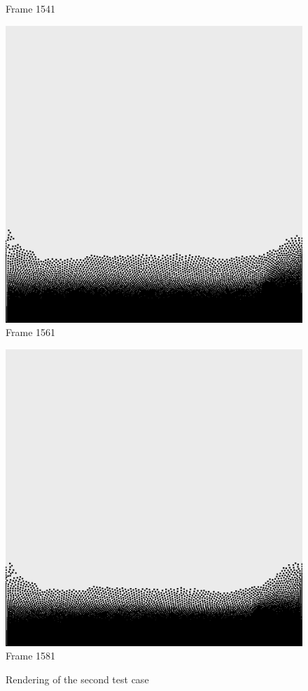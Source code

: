 \documentclass[a4paper, 12pt, oneside]{book}
\begin{document}
\begin{figure}[!ht]
\begin{center}
            Frame 1541
        \end{center}
    \endminipage
    \hfill
        \begin{center}
            \includegraphics[width=\linewidth]{images/test_case_2/1561.png}
            Frame 1561
        \end{center}
    \endminipage
    \hfill
        \begin{center}
            \includegraphics[width=\linewidth]{images/test_case_2/1581.png}
            Frame 1581
        \end{center}
    \endminipage
    \hfill

    \caption{Rendering of the second test case}
    \label{fig:test case 2}
\end{figure}
\end{document}
